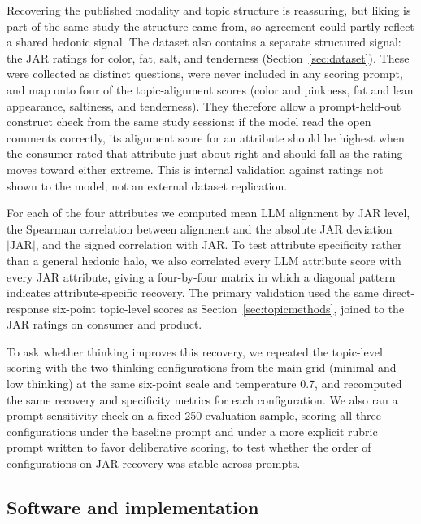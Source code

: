 \documentclass[11pt]{article}
\begin{document}
Recovering the published modality and topic structure is reassuring, but
liking is part of the same study the structure came from, so agreement could
partly reflect a shared hedonic signal. The dataset also contains a separate
structured signal: the JAR ratings for color, fat, salt, and tenderness
(Section~\ref{sec:dataset}). These were collected as distinct questions, were
never included in any scoring prompt, and map onto four of the topic-alignment
scores (color and pinkness, fat and lean appearance, saltiness, and
tenderness). They therefore allow a prompt-held-out construct check from the
same study sessions: if the model read the open comments correctly, its
alignment score for an attribute should be highest when the consumer rated that
attribute just about right and should fall as the rating moves toward either
extreme. This is internal validation against ratings not shown to the model,
not an external dataset replication.

For each of the four attributes we computed mean LLM alignment by JAR level,
the Spearman correlation between alignment and the absolute JAR deviation
$|\mathrm{JAR}|$, and the signed correlation with JAR. To test attribute
specificity rather than a general hedonic halo, we also correlated every LLM
attribute score with every JAR attribute, giving a four-by-four matrix in
which a diagonal pattern indicates attribute-specific recovery. The primary
validation used the same direct-response six-point topic-level scores as
Section~\ref{sec:topicmethods}, joined to the JAR ratings on consumer and
product.

To ask whether thinking improves this recovery, we repeated the topic-level
scoring with the two thinking configurations from the main
grid (minimal and low thinking) at the same six-point scale and temperature
0.7, and recomputed the same recovery and specificity metrics for each
configuration. We also ran a prompt-sensitivity check on a fixed 250-evaluation
sample, scoring all three configurations under the baseline prompt and under a
more explicit rubric prompt written to favor deliberative scoring, to test
whether the order of configurations on JAR recovery was stable across prompts.

\subsection{Software and implementation}
\label{sec:software}
\end{document}

